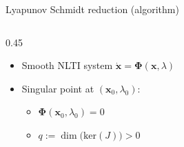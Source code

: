 \documentclass[11pt]{beamer}
\begin{document}
\begin{frame}{Lyapunov Schmidt reduction (algorithm)}
    \begin{columns}
        \vspace{-8mm}
        \begin{column}{0.45\textwidth}
            \begin{itemize}
                \itemsep0em
                \item Smooth NLTI system \(\dot{\mathbf{x}}=\boldsymbol{\Phi}(\mathbf{x},\lambda)\)
                \item Singular point at \((\mathbf{x}_0,\lambda_0)\):
                \begin{itemize}
                    \item \(\boldsymbol{\Phi}(\mathbf{x}_0,\lambda_0) = 0\)
                    \item \(q:=\dim\big(\mathrm{ker}(J)\big)>0\)
                \end{itemize}

\end{itemize}
\end{column}
\end{columns}
\end{frame}
\end{document}
